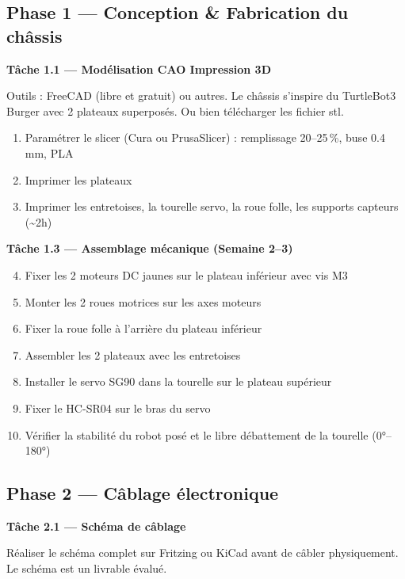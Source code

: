 \documentclass[12pt,a4paper]{article}
\begin{document}
\subsection*{Phase 1 — Conception \& Fabrication du châssis}

\textbf{Tâche 1.1 — Modélisation CAO Impression 3D}

Outils : FreeCAD (libre et gratuit) ou autres. Le châssis s'inspire du TurtleBot3 Burger avec 2 plateaux superposés. Ou bien télécharger les fichier stl.

\begin{enumerate}
  \item Paramétrer le slicer (Cura ou PrusaSlicer) : remplissage 20–25\,\%, buse 0.4 mm, PLA
  \item Imprimer les plateaux
  \item Imprimer les entretoises, la tourelle servo, la roue folle, les supports capteurs (\textasciitilde2h)
\end{enumerate}

\textbf{Tâche 1.3 — Assemblage mécanique (Semaine 2–3)}

\begin{enumerate}
  \setcounter{enumi}{3}
  \item Fixer les 2 moteurs DC jaunes sur le plateau inférieur avec vis M3
  \item Monter les 2 roues motrices sur les axes moteurs
  \item Fixer la roue folle à l'arrière du plateau inférieur
  \item Assembler les 2 plateaux avec les entretoises
  \item Installer le servo SG90 dans la tourelle sur le plateau supérieur
  \item Fixer le HC-SR04 sur le bras du servo
  \item Vérifier la stabilité du robot posé et le libre débattement de la tourelle (0°–180°)
\end{enumerate}

\subsection*{Phase 2 — Câblage électronique}

\textbf{Tâche 2.1 — Schéma de câblage}

Réaliser le schéma complet sur Fritzing ou KiCad avant de câbler physiquement. Le schéma est un livrable évalué.
\end{document}
